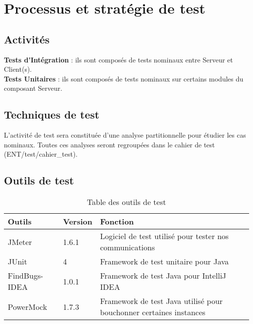 
\chapter{Processus et stratégie de test}
	\section{Activités}

\textbf{Tests d'Intégration} : ils sont composés de tests nominaux entre Serveur et Client(s).\\

\textbf{Tests Unitaires} : ils sont composés de tests nominaux sur certains modules du composant Serveur.

	\section{Techniques de test}

L'activité de test sera constituée d'une analyse partitionnelle pour étudier les cas nominaux. Toutes ces analyses seront regroupées dans le cahier de test (ENT/test/cahier\_test).
	
	\section{Outils de test}
	
\begin{table}[!h]
\begin{center}		
\begin{tabular}{|p{3cm}|p{2cm}|p{8cm}|}
\hline
\textbf{Outils} & \textbf{Version} & \textbf{Fonction}\\
\hline
JMeter & 1.6.1 & Logiciel de test utilisé pour tester nos communications\\
\hline
JUnit & 4 & Framework de test unitaire pour Java\\
\hline
FindBugs-IDEA & 1.0.1 & Framework de test Java pour IntelliJ IDEA\\
\hline
PowerMock & 1.7.3 & Framework de test Java utilisé pour bouchonner certaines instances\\
\hline
\end{tabular}	
\end{center}
\caption{Table des outils de test}
\end{table}
	
\newpage